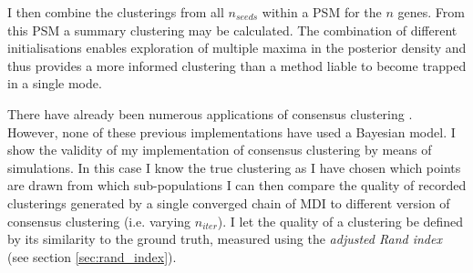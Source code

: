 \documentclass[12pt]{article} %
\begin{document}
	I then combine the clusterings from all $n_{seeds}$ within a PSM for the $n$ genes.  From this PSM a summary clustering may be calculated. The combination of different initialisations enables exploration of multiple maxima in the posterior density and thus provides a more informed clustering than a method liable to become trapped in a single mode. 
	
	
	There have already been numerous applications of consensus clustering \cite{LiWeightedConsensusClustering2008} \cite{LancichinettiConsensusclusteringcomplex2012} \cite{BreimanRandomForests1}. However, none of these previous implementations have used a Bayesian model. I show the validity of my implementation of consensus clustering by means of simulations. In this case I know the true clustering as I have chosen which points are drawn from which sub-populations I can then compare the quality of recorded clusterings generated by a single converged chain of MDI to different version of consensus clustering (i.e. varying $n_{iter}$). I let the quality of a clustering be defined by its similarity to the ground truth, measured using the \emph{adjusted Rand index} (see section \ref{sec:rand_index}).
	


%	
	
	
\end{document}
